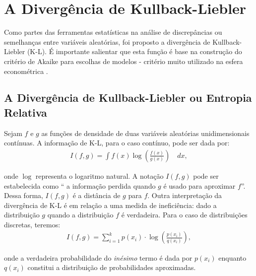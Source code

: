 
\section{A Divergência de Kullback-Liebler}

Como partes das ferramentas estatísticas na análise de discrepâncias ou semelhanças entre variáveis aleatórias, foi proposto a divergência de Kullback-Liebler (K-L). É importante salientar que esta função é base na construção do critério de Akaike para escolhas de modelos - critério muito utilizado na esfera econométrica \cite{wooldridge2006introduccao, gujarati2011econometria}.

\subsection{A Divergência de Kullback-Liebler ou Entropia Relativa}

Sejam $f$ e $g$ as funções de densidade de duas variáveis aleatórias unidimensionais contínuas. A informação de K-L, para o caso contínuo, pode ser dada por: 
\begin{align} \label{kullbackliebler}
I(f, g) = \int f(x)\log\left(\frac{f(x)}{g(x)}\right) \quad dx,
\end{align}

\noindent
onde $\log$ representa o logaritmo natural. A notação $I(f, g)$ pode ser estabelecida como `` a informação perdida quando $g$ é usado para aproximar $f$''. Dessa forma, $I(f, g)$ é a distância de $g$ para $f$. Outra interpretação da divergência de K-L é em relação a uma medida de ineficiência: dado a distribuição $g$ quando a distribuição $f$ é verdadeira.
\noindent
Para o caso de distribuições discretas, teremos:
\begin{align} \label{kullbackdiscreta}
I(f, g) = \sum_{i=1}^{k} p(x_{i}) \cdot \log\left( \frac{p(x_{i})}{q(x_{i})}\right),
\end{align}

\noindent
onde a verdadeira probabilidade do \textit{inésimo} termo é dada por $p(x_{i})$ enquanto $q(x_{i})$ constitui a distribuição de probabilidades aproximadas. %

